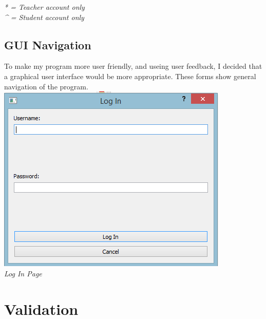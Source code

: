 \documentclass[a4paper,12pt]{report}
\begin{document}
\emph{* = Teacher account only} \\
\emph{\^{} = Student account only}

\subsection{GUI Navigation}
To make my program more user friendly, and useing user feedback, I decided that a graphical user interface would be more appropriate. These forms show general navigation of the program.\\
\includegraphics{login}\\
\emph{Log In Page}\\

\section{Validation}


\bigskip
\end{document}
